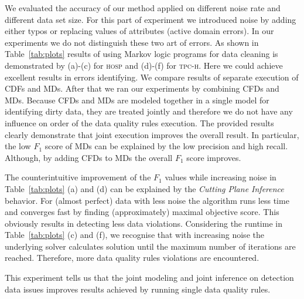 We evaluated the accuracy of our method applied on different noise rate and different data set size. For this part of experiment we introduced noise by adding either typos or replacing values of attributes (active domain errors). In our experiments we do not distinguish these two art of errors. As shown in Table~\ref{tab:plots} results of using Markov logic programs for data cleaning is demonstrated by (a)-(c) for \textsc{hosp} and (d)-(f) for \textsc{tpc-h}. Here we could achieve excellent results in errors identifying. We compare results of separate execution of CDFs and MDs. After that we ran our experiments by combining CFDs and MDs. Because CFDs and MDs are modeled together in a single model for identifying dirty data, they are treated jointly and therefore we do not have any influence on order of the data quality rules execution. The provided results clearly demonstrate that joint execution improves the overall result. In particular, the low $F_1$ score of MDs can be explained by the low precision and high recall. Although, by adding CFDs to MDs the overall $F_1$ score improves. 

The counterintuitive improvement of the $F_1$ values while increasing noise in Table~\ref{tab:plots} (a) and (d) can be explained by the \textit{Cutting Plane Inference} \cite{riedel08improving} behavior. For (almost perfect) data with less noise the algorithm runs less time and converges fast by finding (approximately) maximal objective score. This obviously results in detecting less data violations. Considering the runtime in Table~\ref{tab:plots} (c) and (f), we recognise that with increasing noise the underlying solver calculates solution until the maximum number of iterations are reached. Therefore, more data quality rules violations are encountered.    

This experiment tells us that the joint modeling and joint inference on detection data issues improves results achieved by running single data quality rules.

